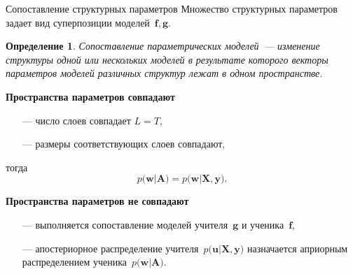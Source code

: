 \documentclass[10pt,pdf,hyperref={unicode}]{beamer}
\newtheorem{rusdefinition}{Определение}
\begin{document}
\begin{frame}{Сопоставление структурных параметров}
Множество структурных параметров задает вид суперпозиции моделей~$\mathbf{f}, \mathbf{g}$.

\begin{rusdefinition}
Сопоставление параметрических моделей~--- изменение структуры одной или нескольких моделей в результате которого векторы параметров моделей различных структур лежат в одном пространстве.
\end{rusdefinition}


\textbf{Пространства параметров совпадают}
\begin{itemize}
    \item[---] число слоев совпадает $L=T$,
    \item[---] размеры соответствующих слоев совпадают,
\end{itemize}
тогда
\[
p\bigr(\mathbf{w}|\mathbf{A}\bigr) = p\bigr(\mathbf{w}|\mathbf{X}, \mathbf{y}\bigr).
\]

\textbf{Пространства параметров не совпадают}
\begin{itemize}
    \item[---] выполняется сопоставление моделей учителя~$\mathbf{g}$ и ученика~$\mathbf{f}$,
    \item[---] апостериорное распределение учителя~$p\bigr(\mathbf{u}|\mathbf{X}, \mathbf{y}\bigr)$ назначается априорным распределением ученика~$p\bigr(\mathbf{w}|\mathbf{A}\bigr)$.
\end{itemize}

\end{frame}
\end{document}
